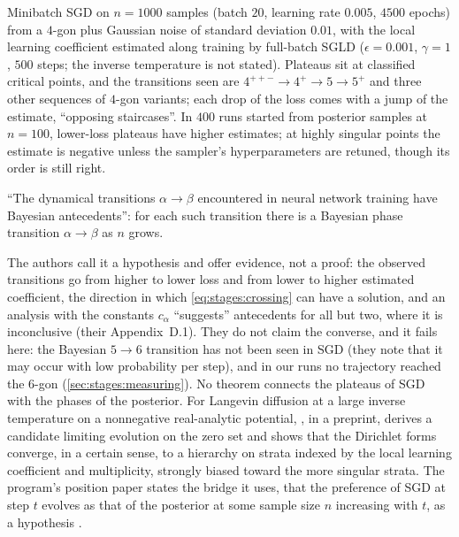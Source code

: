\begin{refsection}
\begin{observation}
Minibatch SGD on $n=1000$ samples (batch $20$, learning rate $0.005$, $4500$ epochs) from a $4$-gon plus Gaussian noise of standard deviation $0.01$, with the local learning coefficient estimated along training by full-batch SGLD ($\epsilon=0.001$, $\gamma=1$, $500$ steps; the inverse temperature is not stated). Plateaus sit at classified critical points, and the transitions seen are $4^{++-}\to4^+\to5\to5^+$ and three other sequences of $4$-gon variants; each drop of the loss comes with a jump of the estimate, ``opposing staircases''. In $400$ runs started from posterior samples at $n=100$, lower-loss plateaus have higher estimates; at highly singular points the estimate is negative unless the sampler's hyperparameters are retuned, though its order is still right.
\end{observation}

\begin{conjecture}\label{conj:stages:bah}
``The dynamical transitions $\alpha\to\beta$ encountered in neural network training have Bayesian antecedents'': for each such transition there is a Bayesian phase transition $\alpha\to\beta$ as $n$ grows.
\end{conjecture}

The authors call it a hypothesis and offer evidence, not a proof: the observed transitions go from higher to lower loss and from lower to higher estimated coefficient, the direction in which \eqref{eq:stages:crossing} can have a solution, and an analysis with the constants $c_\alpha$ ``suggests'' antecedents for all but two, where it is inconclusive (their Appendix~D.1). They do not claim the converse, and it fails here: the Bayesian $5\to6$ transition has not been seen in SGD (they note that it may occur with low probability per step), and in our runs no trajectory reached the $6$-gon (\cref{sec:stages:measuring}). No theorem connects the plateaus of SGD with the phases of the posterior. For Langevin diffusion at a large inverse temperature on a nonnegative real-analytic potential, \textcite{Larsson2026}, in a preprint, derives a candidate limiting evolution on the zero set and shows that the Dirichlet forms converge, in a certain sense, to a hierarchy on strata indexed by the local learning coefficient and multiplicity, strongly biased toward the more singular strata. The program's position paper states the bridge it uses, that the preference of SGD at step $t$ evolves as that of the posterior at some sample size $n$ increasing with $t$, as a hypothesis \parencite{PepinLehalleurEtAl2025}.


\end{refsection}
